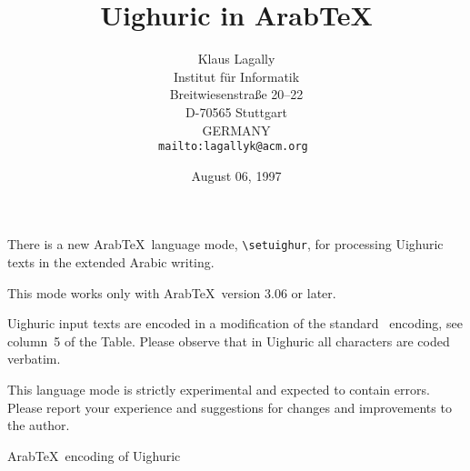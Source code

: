 \documentclass[12pt]{article}
\begin{document}
\title{Uighuric in Arab\TeX} 
\author
{Klaus Lagally\\
Institut f\"ur Informatik\\
Breitwiesenstra\ss e 20--22\\
D-70565 Stuttgart\\
GERMANY\\
\tt mailto:lagallyk@acm.org
}
\date{August 06, 1997}
\maketitle

\setuighur 
\vocalize

There is a new Arab\TeX\ language mode, \verb+\setuighur+,
for processing Uighuric texts in the extended Arabic writing.

This mode works only with Arab\TeX\ version 3.06 or later.

Uighuric input texts are encoded in a modification of the
standard \ArabTeX\ encoding, see
column~5 of the Table.
Please observe that in Uighuric all characters are coded verbatim.

This language mode is strictly experimental
and expected to contain errors.
Please report your experience and suggestions 
for changes and improvements to the author.

\newpage
\parskip 0pt

\begin{center}
Arab\TeX\ encoding of Uighuric
\end{center}
\end{document}
